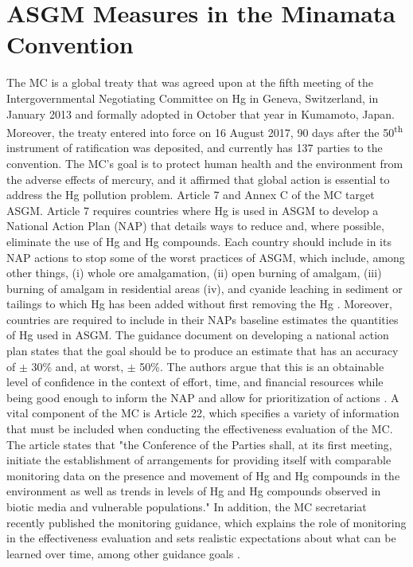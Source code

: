 \section{ASGM Measures in the Minamata Convention}
\begin{flushleft}
    

The MC is a global treaty that was agreed upon at the fifth meeting of the Intergovernmental Negotiating Committee on Hg in Geneva, Switzerland, in January 2013 and formally adopted in October that year in Kumamoto, Japan. Moreover, the treaty entered into force on 16 August 2017, 90 days after the 50\textsuperscript{th} instrument of ratification was deposited, and currently has 137 parties to the convention\cite{unep_minamata_2013}. The MC's goal is to protect human health and the environment from the adverse effects of mercury, and it affirmed that global action is essential to address the Hg pollution problem. Article 7 and Annex C of the MC target ASGM. Article 7 requires countries where Hg is used in ASGM to develop a National Action Plan (NAP) that details ways to reduce and, where possible, eliminate the use of Hg and Hg compounds. Each country should include in its NAP actions to stop some of the worst practices of ASGM, which include, among other things, (i) whole ore amalgamation, (ii) open burning of amalgam, (iii) burning of amalgam in residential areas (iv), and cyanide leaching in sediment or tailings to which Hg has been added without first removing the Hg \cite{united_nations_environment_programme_technical_2019}.
Moreover, countries are required to include in their NAPs baseline estimates the quantities of Hg used in ASGM. The guidance document on developing a national action plan states that the goal should be to produce an estimate that has an accuracy of $\pm$ 30\% and, at worst, $\pm$ 50\%. The authors argue that this is an obtainable level of confidence in the context of effort, time, and financial resources while being good enough to inform the NAP and allow for prioritization of actions \cite{unep_developing_2017}. A vital component of the MC is Article 22, which specifies a variety of information that must be included when conducting the effectiveness evaluation of the MC. The article states that "the Conference of the Parties shall, at its first meeting, initiate the establishment of arrangements for providing itself with comparable monitoring data on the presence and movement of Hg and Hg compounds in the environment as well as trends in levels of Hg and Hg compounds observed in biotic media and vulnerable populations." In addition, the MC secretariat recently published the monitoring guidance, which explains the role of monitoring in the effectiveness evaluation and sets realistic expectations about what can be learned over time, among other guidance goals \cite{unep_guidance_2021}. 
\end{flushleft}

